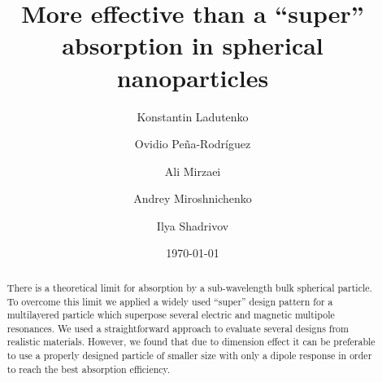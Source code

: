\documentclass[aps,prl,twocolumn,showpacs,superscriptaddress,groupedaddress]{revtex4-1}
\begin{document}

\title{More effective than a ``super'' absorption in spherical nanoparticles}


\author{Konstantin Ladutenko} 


\author{Ovidio Pe\~{n}a-Rodr\'{i}guez} 


\author{Ali Mirzaei} 
\author{Andrey Miroshnichenko}
\author{Ilya Shadrivov}

\date{\today}

\begin{abstract}
  There is a theoretical limit for absorption by a sub-wavelength bulk
  spherical particle.  To overcome this limit we applied a widely used
  ``super'' design pattern for a multilayered particle which superpose
  several electric and magnetic multipole resonances.  We used a
  straightforward approach to evaluate several designs from realistic
  materials.  However, we found that due to dimension effect it can be
  preferable to use a properly designed particle of smaller size with
  only a dipole response in order to reach the best absorption
  efficiency.
\end{abstract}
\end{document}
